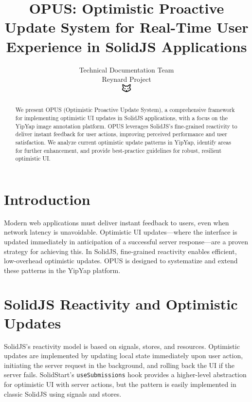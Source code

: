 \documentclass[10pt]{article}
\begin{document}
\title{OPUS: Optimistic Proactive Update System for Real-Time User Experience in SolidJS Applications}

\author{Technical Documentation Team\\Reynard Project\\\includegraphics[width=0.5cm]{../../shared-assets/favicon.pdf}}

\maketitle

\begin{abstract}
We present OPUS (Optimistic Proactive Update System), a comprehensive framework for implementing optimistic UI updates in SolidJS applications, with a focus on the YipYap image annotation platform. OPUS leverages SolidJS's fine-grained reactivity to deliver instant feedback for user actions, improving perceived performance and user satisfaction. We analyze current optimistic update patterns in YipYap, identify areas for further enhancement, and provide best-practice guidelines for robust, resilient optimistic UI.
\end{abstract}

\section{Introduction}
Modern web applications must deliver instant feedback to users, even when network latency is unavoidable. Optimistic UI updates---where the interface is updated immediately in anticipation of a successful server response---are a proven strategy for achieving this. In SolidJS, fine-grained reactivity enables efficient, low-overhead optimistic updates. OPUS is designed to systematize and extend these patterns in the YipYap platform.

\section{SolidJS Reactivity and Optimistic Updates}
SolidJS's reactivity model is based on signals, stores, and resources. Optimistic updates are implemented by updating local state immediately upon user action, initiating the server request in the background, and rolling back the UI if the server fails. SolidStart's \texttt{useSubmissions} hook provides a higher-level abstraction for optimistic UI with server actions, but the pattern is easily implemented in classic SolidJS using signals and stores.
\end{document}
